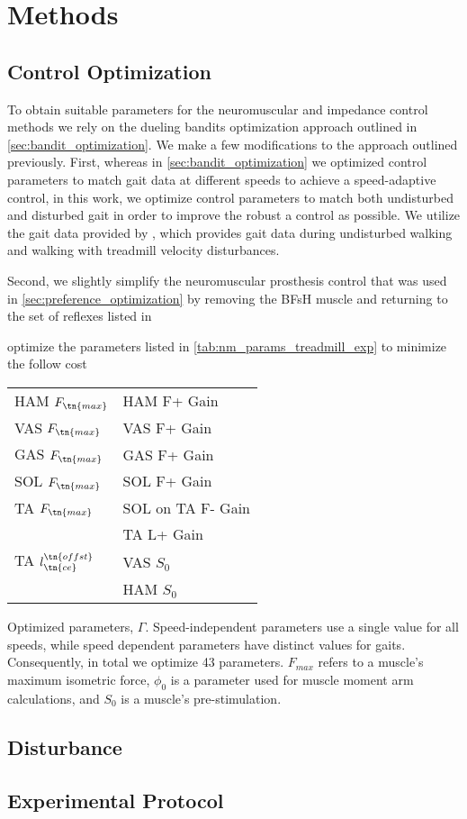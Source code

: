 \section{Methods}

\subsection{Control Optimization}
To obtain suitable parameters for the neuromuscular and impedance control
methods we rely on the dueling bandits optimization approach outlined in
\cref{sec:bandit_optimization}. We make a few modifications to the approach
outlined previously. First, whereas in \cref{sec:bandit_optimization} we
optimized control parameters to match gait data at different speeds to achieve a
speed-adaptive control, in this work, we optimize control parameters to match
both undisturbed and disturbed gait in order to improve the robust a control as
possible. We utilize the gait data provided by \citet{moore2015elaborate}, which
provides gait data during undisturbed walking and walking with treadmill
velocity disturbances. 

Second, we slightly simplify the neuromuscular prosthesis control that was used
in \cref{sec:preference_optimization} by removing the BFsH muscle and returning
to the set of reflexes listed in

optimize the parameters
listed in \cref{tab:nm_params_treadmill_exp} to minimize the follow cost

\begin{margintable}    
    \centering
    \begin{tabular}{ll}
        \hline
        HAM $F_\tn{max}$                    & HAM F+ Gain         \\
        VAS $F_\tn{max}$                    & VAS F+ Gain         \\
        GAS $F_\tn{max}$                    & GAS F+ Gain         \\
        SOL $F_\tn{max}$                    & SOL F+ Gain         \\
        TA  $F_\tn{max}$                    & SOL on TA F- Gain   \\
                                            & TA L+ Gain          \\
        TA $l_\tn{ce}^\tn{offst}$           & VAS $S_0$           \\
                                            & HAM $S_0$           \\
    \end{tabular}
    \caption{Optimized parameters, $\Gamma$. Speed-independent parameters use a
    single value for all speeds, while speed dependent parameters have distinct
    values for  gaits. Consequently, in total
    we optimize 43 parameters. $F_{max}$ refers to a muscle's maximum isometric
    force, $\phi_0$ is a parameter used for muscle moment arm calculations, and
    $S_0$ is a muscle's pre-stimulation.}\label{tab:nm_params_treadmill_exp}
\end{margintable}

\subsection{Disturbance}

\subsection{Experimental Protocol}
